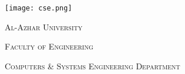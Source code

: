 {
  \begin{center}
    \texttt{[image: cse.png]}
  \end{center}
  \par
}
{\scshape\large Al-Azhar University\par}
{\scshape\Large Faculty of Engineering\par}
{\scshape\LARGE Computers \& Systems Engineering Department\par}